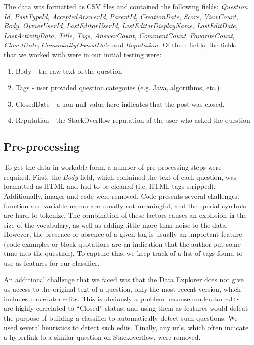 \documentclass[11pt]{article}
\begin{document}
The data was formatted as CSV files and contained the following
fields: \emph{Question Id}, \emph{PostTypeId},
\emph{AcceptedAnswerId}, \emph{ParentId}, \emph{CreationDate},
\emph{Score}, \emph{ViewCount}, \emph{Body}, \emph{OwnerUserId},
\emph{LastEditorUserId}, \emph{LastEditorDisplayName},
\emph{LastEditDate}, \emph{LastActivityData}, \emph{Title},
\emph{Tags}, \emph{AnswerCount}, \emph{CommentCount},
\emph{FavoriteCount}, \emph{ClosedDate}, \emph{CommunityOwnedDate} and
\emph{Reputation}. Of these fields, the fields that we worked
with were in our initial testing were:

\begin{enumerate}
  \item Body - the raw text of the question
  \item Tags - user provided question categories (e.g. Java,
    algorithms, etc.)
  \item ClosedDate - a non-null value here indicates that the post was
    closed.
    \item Reputation - the StackOverflow reputation of the user who
      asked the question
\end{enumerate}

\subsection{Pre-processing}
To get the data in workable form, a number of pre-processing steps
were required. First, the \emph{Body} field, which contained the text of
each question, was formatted as HTML and had to be
cleaned (i.e. HTML tags stripped). Additionally, images and code were
removed. Code presents several challenges: function and variable names are usually not meaningful, and the special symbols are hard to tokenize. The combination of these factors causes an explosion in the size of the vocabulary, as well as adding little more than noise to the data. However, the presence or absence of a given tag is usually an important feature (code examples or block quotations are an indication that the author put some time into the question). To capture this, we keep track of a list of tags found to use as features for our classifier.

An additional challenge that we faced was that the Data Explorer does
not give us access to the original text of a question, only the most
recent version, which includes moderator edits. This is obviously a
problem because moderator edits are highly correlated to ``Closed''
status, and using them as features would defeat the purpose of
building a classifier to automatically detect such questions. We used
several heuristics to detect such edits. Finally, any urls, which
often indicate a hyperlink to a similar question on Stackoverflow,
were removed.
\end{document}
